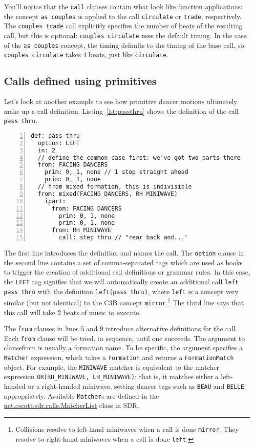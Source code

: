 \documentclass[12pt]{article}
\newcommand{\clause}[1]{\texttt{#1}}
\renewcommand{\call}[1]{\texttt{#1}} %
\newcommand{\package}[1]{\url{#1}}
\begin{document}
You'll notice that the \clause{call} clauses contain what look like
function applications: the concept \call{as couples} is applied to
the call \call{circulate} or \call{trade}, respectively.  The
\call{couples trade} call explicitly specifies the number of beats of
the resulting call, but this is optional: \call{couples circulate}
uses the default timing.  In the case of the \call{as couples}
concept, the timing defaults to the timing of the base call, so
\call{couples circulate} takes 4 beats, just like \call{circulate}.

\subsection{Calls defined using primitives}
Let's look at another example to see how primitive dancer motions
ultimately make up a call definition.  Listing~\ref{lst:passthru}
shows the definition of the call \call{pass thru}.

\begin{lstlisting}[numbers=left,float,caption=A definition with primitives.,label=lst:passthru]
def: pass thru
  option: LEFT
  in: 2
  // define the common case first: we've got two parts there
  from: FACING DANCERS
    prim: 0, 1, none // 1 step straight ahead
    prim: 0, 1, none
  // from mixed formation, this is indivisible
  from: mixed(FACING DANCERS, RH MINIWAVE)
    ipart:
      from: FACING DANCERS
        prim: 0, 1, none
        prim: 0, 1, none
      from: RH MINIWAVE
        call: step thru // "rear back and..."
\end{lstlisting}

The first line introduces the definition and names the call.
The \clause{option} clause in the second line
contains a set of comma-separated tags which are used as hooks to trigger
the creation of additional call definitions or grammar rules.
In this case, the \texttt{LEFT} tag signifies that we will
automatically create an additional call \call{left pass thru} with
the definition \texttt{left(pass thru)}, where \call{left} is a
concept very similar (but not identical) to the C3B concept
\call{mirror}.\footnote{Collisions resolve to left-hand miniwaves when
  a call is done \call{mirror}.  They resolve to right-hand miniwaves
  when a call is done \call{left}.}
The third line says that this call will take 2 beats of music to execute.

The \clause{from} clauses in lines 5 and 9 introduce alternative
definitions for the call.  Each \clause{from} clause will be tried, in
sequence, until one succeeds.  The argument to clause{from} is
usually a formation name.  To be specific, the argument specifies a
\texttt{Matcher} expression, which takes a \texttt{Formation} and
returns a \texttt{FormationMatch} object.  For example, the
\texttt{MINIWAVE} matcher is equivalent to the matcher expression
\texttt{OR(RH\_MINIWAVE, LH\_MINIWAVE)}; that is, it matches either a
left-handed or a right-handed miniwave, setting dancer tags such as
\texttt{BEAU} and \texttt{BELLE} appropriately.  Available
\texttt{Matcher}s are defined in the
\package{net.cscott.sdr.calls.MatcherList} class in SDR.
\end{document}
